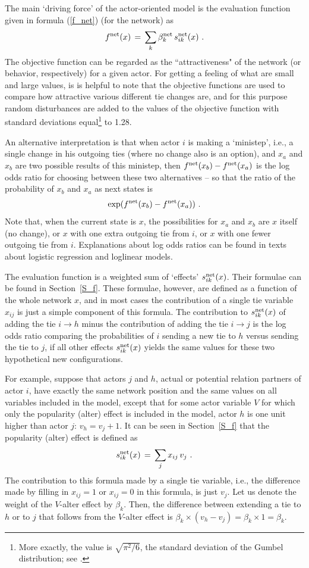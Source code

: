 \documentclass[a4paper,fleqn]{article}
\newcommand{\+}{\, + \,}
\begin{document}
{The main `driving force' of the actor-oriented model
is the evaluation function
\citep[in earlier publications called objective function,
see][]{Snijders01, Snijders05} given in formula (\ref{f_net})
(for the network) as
\[
f^{\rm net}(x) \, = \, \sum_k \beta^{\rm net}_k \, s^{\rm net}_{ik}(x)   \ .
\]
The objective function can be regarded as the ``attractiveness"
of the network (or behavior, respectively) for a given actor.
For getting a feeling of what are small and large values,
is is helpful to note that the objective functions are
used to compare how attractive various different tie changes are,
and for this purpose random disturbances are added
to the values of the objective function with standard deviations
equal\footnote{More exactly, the value is $\sqrt{\pi^2/6}$,
the standard deviation of the Gumbel
distribution; see \citet{Snijders01}.} to 1.28.

An alternative interpretation is that when actor $i$ is making
a `ministep', i.e., a single change in his outgoing ties
(where no change also is an option), and
$x_a$ and $x_b$ are two possible results of this ministep,
then $f^{\rm net}(x_b) - f^{\rm net}(x_a)$ is the log odds ratio
for choosing between these two alternatives -- so that the ratio
of the probability of $x_b$ and $x_a$ as next states is
\[
  \exp(f^{\rm net}(x_b) - f^{\rm net}(x_a)) \ .
\]
Note that, when the current state is $x$, the possibilities
for $x_a$ and $x_b$ are $x$ itself (no change), or $x$ with one extra
outgoing tie from $i$, or $x$ with one fewer outgoing tie from $i$.
Explanations about log odds ratios can be found
in texts about logistic regression and loglinear models.

The evaluation function is a weighted sum of `effects'
$s^{\rm net}_{ik}(x)$.
Their formulae can be found in Section~\ref{S_f}.
These formulae, however, are defined as a function of the whole
network $x$, and in most cases the contribution of a single tie
variable $x_{ij}$ is just a simple component of this formula.
The contribution to $s^{\rm net}_{ik}(x)$
of adding the tie $i \rightarrow h$ minus the
contribution of adding the tie $i \rightarrow j$ is the log odds ratio
comparing the probabilities of $i$ sending a new tie to $h$ versus
sending the tie to $j$, if all other effects $s^{\rm net}_{ik}(x)$
yields the same values for these two hypothetical new configurations.

For example, suppose that actors $j$ and $h$,
actual or potential relation partners of actor $i$,
have exactly the same network
position and the same values on all variables included in the model,
except that for some actor variable $V$ for which only the
popularity (alter) effect is included in the model,
actor $h$ is one unit higher than actor $j$: $v_h = v_j + 1$.
It can be seen in Section~\ref{S_f} that
the popularity (alter) effect is defined as
\[
s^{\rm net}_{ik}(x) \, = \,  \sum_j x_{ij}\, v_j \ .
\]
The contribution to this formula made by a single tie variable,
i.e., the difference made by filling in $x_{ij} = 1$ or $x_{ij} = 0$
in this formula, is just $v_j$.
Let us denote the weight of the $V$-alter effect by $\beta_k$.
Then, the difference between extending a tie to $h$ or to $j$
that follows from the $V$-alter effect is
$\beta_k \times (v_h - v_j) = \beta_k \times 1 = \beta_k$.

}
\end{document}
